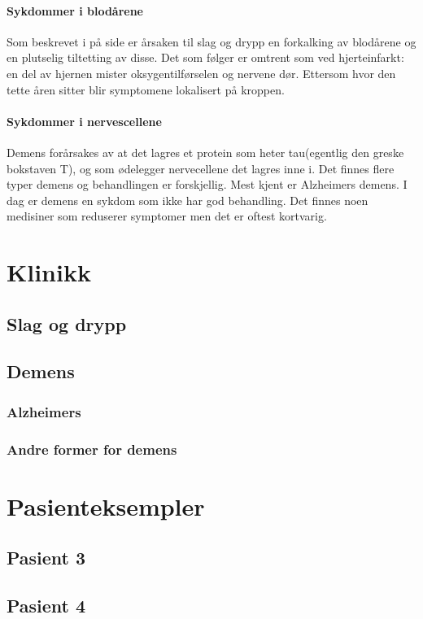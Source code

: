 			\paragraph{Sykdommer i blodårene\\}
				Som beskrevet i  på side \pageref{sec:athero} %
				er årsaken til slag og drypp en forkalking av blodårene og en plutselig tiltetting av disse\cite{FA-athero}. Det som følger er omtrent som ved hjerteinfarkt: en del av hjernen mister oksygentilførselen og nervene dør. Ettersom hvor den tette åren sitter blir symptomene lokalisert på kroppen.
			\paragraph{Sykdommer i nervescellene\\}
				Demens forårsakes av at det lagres et protein som heter tau(egentlig den greske bokstaven T), og som ødelegger nervecellene det lagres inne i. Det finnes flere typer demens og behandlingen er forskjellig. Mest kjent er Alzheimers demens. I dag er demens en sykdom som ikke har god behandling. Det finnes noen medisiner som reduserer symptomer men det er oftest kortvarig. 
		\section{Klinikk}
			\subsection{Slag og drypp}
			\subsection{Demens}
				\subsubsection{Alzheimers}
				\subsubsection{Andre former for demens}
		\section{Pasienteksempler}
			\subsection{Pasient 3}
			\subsection{Pasient 4}


\newpage